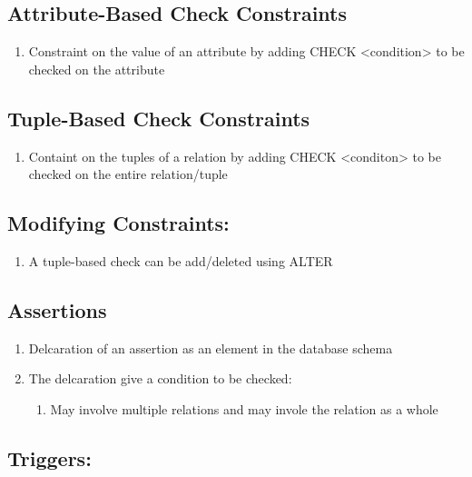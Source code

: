 \documentclass[11pt]{article}
\begin{document}
\subsection{Attribute-Based Check Constraints}
\label{sec-6.3}

\begin{enumerate}
\item Constraint on the value of an attribute by adding CHECK
      <condition> to be checked on the attribute
\end{enumerate}
\subsection{Tuple-Based Check Constraints}
\label{sec-6.4}

\begin{enumerate}
\item Containt on the tuples of a relation by adding CHECK <conditon>
      to be checked on the entire relation/tuple
\end{enumerate}
\subsection{Modifying Constraints:}
\label{sec-6.5}

\begin{enumerate}
\item A tuple-based check can be add/deleted using ALTER
\end{enumerate}
\subsection{Assertions}
\label{sec-6.6}

\begin{enumerate}
\item Delcaration of an assertion as an element in the database schema
\item The delcaration give a condition to be checked:

\begin{enumerate}
\item May involve multiple relations and may invole the relation as
         a whole
\end{enumerate}

\end{enumerate}
\subsection{Triggers:}
\label{sec-6.7}
\end{document}
